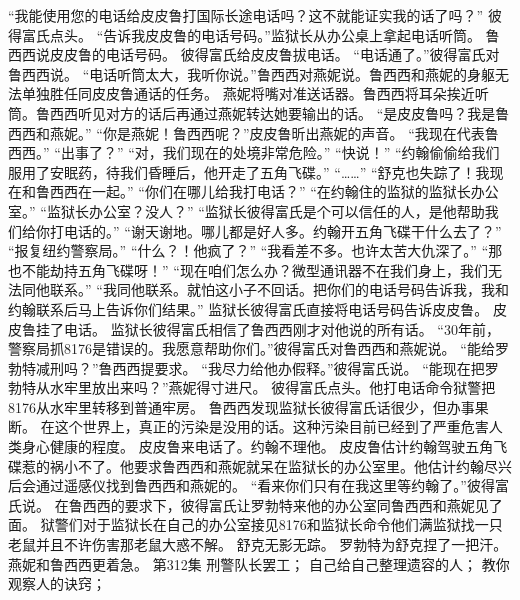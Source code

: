 \documentclass[a4paper,12pt,UTF8,twoside]{ctexbook}
\begin{document}
        “我能使用您的电话给皮皮鲁打国际长途电话吗？这不就能证实我的话了吗？”  
        彼得富氏点头。  
        “告诉我皮皮鲁的电话号码。”监狱长从办公桌上拿起电话听筒。  
        鲁西西说皮皮鲁的电话号码。  
        彼得富氏给皮皮鲁拔电话。        
        “电话通了。”彼得富氏对鲁西西说。  
        “电话听筒太大，我听你说。”鲁西西对燕妮说。鲁西西和燕妮的身躯无法单独胜任同皮皮鲁通话的任务。  
        燕妮将嘴对准送话器。鲁西西将耳朵挨近听筒。鲁西西听见对方的话后再通过燕妮转达她要输出的话。  
        “是皮皮鲁吗？我是鲁西西和燕妮。”  
        “你是燕妮！鲁西西呢？”皮皮鲁昕出燕妮的声音。  
        “我现在代表鲁西西。”  
        “出事了？”  
        “对，我们现在的处境非常危险。”  
        “快说！”  
        “约翰偷偷给我们服用了安眠药，待我们昏睡后，他开走了五角飞碟。”  
        “……”  
        “舒克也失踪了！我现在和鲁西西在一起。”  
        “你们在哪儿给我打电话？”  
        “在约翰住的监狱的监狱长办公室。”  
        “监狱长办公室？没人？”  
        “监狱长彼得富氏是个可以信任的人，是他帮助我们给你打电话的。”  
        “谢天谢地。哪儿都是好人多。约翰开五角飞碟干什么去了？”  
        “报复纽约警察局。”  
        “什么？！他疯了？”  
        “我看差不多。也许太苦大仇深了。”  
        “那也不能劫持五角飞碟呀！”  
        “现在咱们怎么办？微型通讯器不在我们身上，我们无法同他联系。”  
        “我同他联系。就怕这小子不回话。把你们的电话号码告诉我，我和约翰联系后马上告诉你们结果。”  
        监狱长彼得富氏直接将电话号码告诉皮皮鲁。  
        皮皮鲁挂了电话。  
        监狱长彼得富氏相信了鲁西西刚才对他说的所有话。  
        “30年前，警察局抓8176是错误的。我愿意帮助你们。”彼得富氏对鲁西西和燕妮说。  
        “能给罗勃特减刑吗？”鲁西西提要求。  
        “我尽力给他办假释。”彼得富氏说。  
        “能现在把罗勃特从水牢里放出来吗？”燕妮得寸进尺。  
        彼得富氏点头。他打电话命令狱警把8176从水牢里转移到普通牢房。  
        鲁西西发现监狱长彼得富氏话很少，但办事果断。        
        在这个世界上，真正的污染是没用的话。这种污染目前已经到了严重危害人类身心健康的程度。  
        皮皮鲁来电话了。约翰不理他。  
        皮皮鲁估计约翰驾驶五角飞碟惹的祸小不了。他要求鲁西西和燕妮就呆在监狱长的办公室里。他估计约翰尽兴后会通过遥感仪找到鲁西西和燕妮的。  
        “看来你们只有在我这里等约翰了。”彼得富氏说。  
        在鲁西西的要求下，彼得富氏让罗勃特来他的办公室同鲁西西和燕妮见了面。  
        狱警们对于监狱长在自己的办公室接见8176和监狱长命令他们满监狱找一只老鼠并且不许伤害那老鼠大惑不解。  
        舒克无影无踪。  
        罗勃特为舒克捏了一把汗。燕妮和鲁西西更着急。          第312集  
        刑警队长罢工；  
        自己给自己整理遗容的人；  
        教你观察人的诀窍；  
\end{document}

